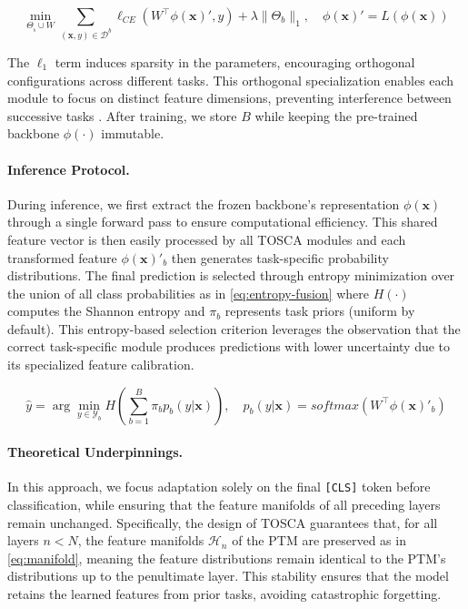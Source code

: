 \begin{equation}
\min_{\Theta_{_b} \cup W} \sum_{(\mathbf{x},y) \in \mathcal{D}^b} \ell_{CE}\left(W^\top \phi(\mathbf{x})', y\right) + \lambda \|\Theta_b\|_1, \quad \phi(\mathbf{x})' = L(\phi(\mathbf{x})) 
\label{eq:training-loss}
\end{equation}

The $\ell_1$ term induces sparsity in the parameters, encouraging orthogonal configurations across different tasks. This orthogonal specialization enables each module to focus on distinct feature dimensions, preventing interference between successive tasks \cite{sparse_orthogonal, o_lora}. After training, we store $B$ while keeping the pre-trained backbone $\phi(\cdot)$ immutable.

\paragraph{Inference Protocol.}  
During inference, we first extract the frozen backbone's representation $\phi(\mathbf{x})$ through a single forward pass to ensure computational efficiency. This shared feature vector is then easily processed by all TOSCA modules and each transformed feature $\phi(\mathbf{x})'_b$ then generates task-specific probability distributions. The final prediction is selected through entropy minimization over the union of all class probabilities as in \cref{eq:entropy-fusion} where $H(\cdot)$ computes the Shannon entropy and $\pi_b$ represents task priors (uniform by default). This entropy-based selection criterion leverages the observation that the correct task-specific module produces predictions with lower uncertainty due to its specialized feature calibration.

\begin{equation}
\hat{y} = \arg\min_{y \in \mathcal{Y}_b} H\left(\sum_{b=1}^B \pi_b p_b(y|\mathbf{x})\right), \quad p_b(y|\mathbf{x}) = softmax(W^\top \phi(\mathbf{x})'_b)
\label{eq:entropy-fusion}
\end{equation}

\paragraph{Theoretical Underpinnings.}
In this approach, we focus adaptation solely on the final \texttt{[CLS]} token before classification, while ensuring that the feature manifolds of all preceding layers remain unchanged. Specifically, the design of TOSCA guarantees that, for all layers $n < N$, the feature manifolds $ \mathcal{H}_n$ of the PTM are preserved as in \cref{eq:manifold}, meaning the feature distributions remain identical to the PTM's distributions up to the penultimate layer. This stability ensures that the model retains the learned features from prior tasks, avoiding catastrophic forgetting.

